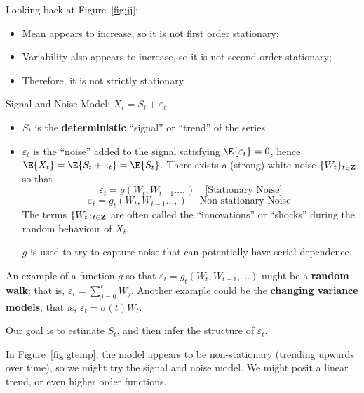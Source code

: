 Looking back at Figure~\ref{fig:jj}:
\begin{itemize}
    \item Mean appears to increase, so it is not first order stationary;
    \item Variability also appears to increase, so it is not
          second order stationary;
    \item Therefore, it is not strictly stationary.
\end{itemize}
Signal and Noise Model: $ X_t=S_t+\varepsilon_t $
\begin{itemize}
    \item $ S_t $ is the \textbf{deterministic}
          ``signal'' or ``trend'' of the series
    \item $ \varepsilon_t $ is the ``noise'' added
          to the signal satisfying $ \E{\varepsilon_t}=0 $, hence
          $ \E{X_t}=\E{S_t+\varepsilon_t}=\E{S_t} $.
          There exists a (strong) white noise $ \{W_t\}_{t\in\mathbf{Z}} $
          so that
          \[ \varepsilon_t=g(W_t,W_{t-1}\ldots,)\quad\text{[Stationary Noise]} \]
          \[ \varepsilon_t=g_t(W_t,W_{t-1}\ldots,)\quad\text{[Non-stationary Noise]} \]
          The terms $ \{W_t\}_{t\in\mathbf{Z}} $ are often called the
          ``innovations'' or ``shocks'' during the random behaviour
          of $ X_t $.

              {\color{blue}$ g $ is used to try to capture noise that can
                  potentially have serial dependence.}
\end{itemize}
\begin{Example}{}{}
    An example of a function $ g $ so that $ \varepsilon_t=g_t(W_t,W_{t-1},\ldots) $
    might be a \textbf{random walk}; that is, $ \varepsilon_t=\sum_{j=0}^{t} W_j $.
    Another example could be the \textbf{changing variance models}; that is,
    $ \varepsilon_t=\sigma(t)W_t $.
\end{Example}
Our goal is to estimate $ S_t $, and then infer the structure of $ \varepsilon_t $.

In Figure~\ref{fig:gtemp}, the model appears to be non-stationary
(trending upwards over time),
so we might try the signal and noise model. We might posit
a linear trend, or even higher order functions.

